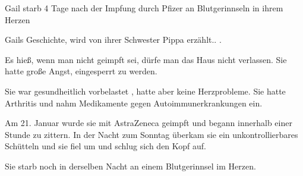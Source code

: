 

Gail starb 4 Tage nach der Impfung durch Pfizer an Blutgerinnseln in ihrem Herzen

Gails Geschichte, wird von ihrer Schwester Pippa erzählt.. .

Es hieß, wenn man nicht geimpft sei, dürfe man das Haus nicht verlassen. Sie hatte große Angst, eingesperrt zu werden.

Sie war gesundheitlich vorbelastet , hatte aber keine Herzprobleme. Sie hatte Arthritis und nahm Medikamente gegen Autoimmunerkrankungen ein.

Am 21. Januar wurde sie mit AstraZeneca geimpft und begann innerhalb einer Stunde zu zittern. In der Nacht zum Sonntag überkam sie ein unkontrollierbares Schütteln und sie fiel um und schlug sich den Kopf auf.

Sie starb noch in derselben Nacht an einem Blutgerinnsel im Herzen.
